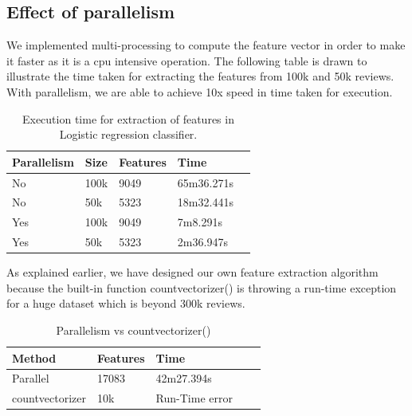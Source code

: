 \documentclass{article}
\begin{document}
\subsection{Effect of parallelism}
We implemented multi-processing to compute the feature vector in order to make it faster as it is a cpu intensive operation. The following table is drawn to illustrate the time taken for extracting the features from 100k and 50k reviews. With parallelism, we are able to achieve 10x speed in time taken for execution.


\begin{table}[H]
\caption{Execution time for extraction of features in Logistic regression classifier.}
\label{sample-table}
\begin{center}
\begin{small}
\begin{sc}
\begin{tabular}{lllll}
\hline
Parallelism & Size & Features & Time \\
\hline
No  & 100k & 9049 & 65m36.271s \\
No  & 50k & 5323 & 18m32.441s \\
Yes  & 100k & 9049 & 7m8.291s \\
Yes  & 50k & 5323 & 2m36.947s \\
\hline
\end{tabular}
\end{sc}
\end{small}
\end{center}
\end{table}


As explained earlier, we have designed our own feature extraction algorithm because the built-in function countvectorizer() is throwing a run-time exception for a huge dataset which is beyond 300k reviews.


\begin{table}[H]
\caption{Parallelism vs countvectorizer()}
\label{sample-table}
\begin{center}
\begin{small}
\begin{sc}
\begin{tabular}{lllll}
\hline
Method & Features & Time \\
\hline
Parallel  & 17083 & 42m27.394s \\
countvectorizer  & 10k & Run-Time error \\
\hline
\end{tabular}
\end{sc}
\end{small}
\end{center}
\end{table}
\end{document}
